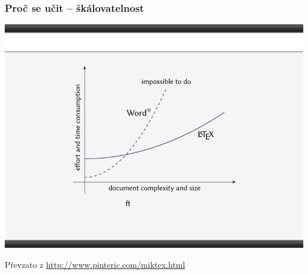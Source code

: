 \begin{frame}
	\frametitle{Proč se učit  -- škálovatelnost}
	\begin{center}
		\includegraphics{Lecture1/Figures/Scalability.pdf}\par
		\begin{tiny}
			Převzato z \url{http://www.pinteric.com/miktex.html}
		\end{tiny}
	\end{center}
\end{frame}


